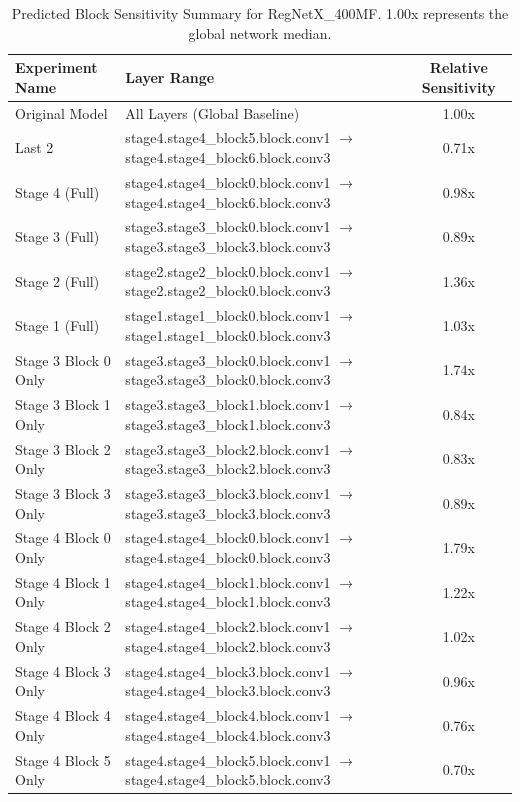 \begin{table}[h]
\caption{Predicted Block Sensitivity Summary for RegNetX_400MF. 1.00x represents the global network median.}
\label{tab:rel_sens_summary_regnetx_400mf}
\begin{tabular}{llc}
\toprule
Experiment Name & Layer Range & Relative Sensitivity \\
\midrule
Original Model & All Layers (Global Baseline) & 1.00x \\
Last 2 & stage4.stage4\_block5.block.conv1 $\to$ stage4.stage4\_block6.block.conv3 & 0.71x \\
Stage 4 (Full) & stage4.stage4\_block0.block.conv1 $\to$ stage4.stage4\_block6.block.conv3 & 0.98x \\
Stage 3 (Full) & stage3.stage3\_block0.block.conv1 $\to$ stage3.stage3\_block3.block.conv3 & 0.89x \\
Stage 2 (Full) & stage2.stage2\_block0.block.conv1 $\to$ stage2.stage2\_block0.block.conv3 & 1.36x \\
Stage 1 (Full) & stage1.stage1\_block0.block.conv1 $\to$ stage1.stage1\_block0.block.conv3 & 1.03x \\
Stage 3 Block 0 Only & stage3.stage3\_block0.block.conv1 $\to$ stage3.stage3\_block0.block.conv3 & 1.74x \\
Stage 3 Block 1 Only & stage3.stage3\_block1.block.conv1 $\to$ stage3.stage3\_block1.block.conv3 & 0.84x \\
Stage 3 Block 2 Only & stage3.stage3\_block2.block.conv1 $\to$ stage3.stage3\_block2.block.conv3 & 0.83x \\
Stage 3 Block 3 Only & stage3.stage3\_block3.block.conv1 $\to$ stage3.stage3\_block3.block.conv3 & 0.89x \\
Stage 4 Block 0 Only & stage4.stage4\_block0.block.conv1 $\to$ stage4.stage4\_block0.block.conv3 & 1.79x \\
Stage 4 Block 1 Only & stage4.stage4\_block1.block.conv1 $\to$ stage4.stage4\_block1.block.conv3 & 1.22x \\
Stage 4 Block 2 Only & stage4.stage4\_block2.block.conv1 $\to$ stage4.stage4\_block2.block.conv3 & 1.02x \\
Stage 4 Block 3 Only & stage4.stage4\_block3.block.conv1 $\to$ stage4.stage4\_block3.block.conv3 & 0.96x \\
Stage 4 Block 4 Only & stage4.stage4\_block4.block.conv1 $\to$ stage4.stage4\_block4.block.conv3 & 0.76x \\
Stage 4 Block 5 Only & stage4.stage4\_block5.block.conv1 $\to$ stage4.stage4\_block5.block.conv3 & 0.70x \\

\end{tabular}
\end{table}
